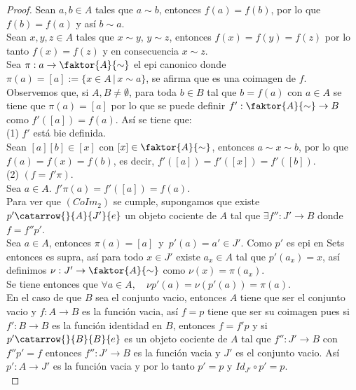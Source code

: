 \documentclass{article}
\begin{document}
\begin{enumerate}[label=\textbf{Ej \arabic*.}]
\begin{proof}
\quad Sean $a,b\in A$ tales que $a\sim b$, entonces $f(a)=f(b)$, por lo que $f(b)=f(a)$ y así $b\sim a$.\\

\quad Sean $x,y,z\in A$ tales que $x\sim y$, $y\sim z$, entonces $f(x)=f(y)=f(z)$ por lo tanto $f(x)=f(z)$ y en consecuencia
$x\sim z$.\\

Sea $\pi:a\to \faktor{A}{\sim}$ el epi canonico donde $\pi(a)=[a]:=\{x\in A\,|\,x\sim a\}$, se afirma que es una coimagen de $f$.\\

Observemos que, si $A,B\neq \emptyset$, para toda $b\in B$ tal que $b=f(a)$ con $a\in A$ se tiene que $\pi(a)=[a]$ por lo que se puede definir 
$f': \faktor{A}{\sim}\to B$ como $f'([a])=f(a)$. Así se tiene que:\\

(1) $f'$ está bie definida.\\

Sean $[a][b]\in [x]$ con $[x]\in  \faktor{A}{\sim}$, entonces $a\sim x\sim b$, por lo que \\$f(a)=f(x)=f(b)$, es decir, $f'([a])=f'([x])=f'([b])$.\\

(2) $(f=f'\pi)$.\\

Sea $a\in A$. $f'\pi(a)=f'([a])=f(a)$.\\

Para ver que $(CoIm_2)$ se cumple, supongamos que existe $p'\catarrow{}{A}{J'}{e}$  un objeto cociente de $A$ tal que $\exists f'':J'\to B$ donde 
$f=f''p'$.\\
Sea $a\in A$, entonces $\pi(a)=[a]$\,\,\,y\,\,\,$p'(a)=a'\in J'$. Como $p'$ es epi en Sets entonces es supra, así para todo $x\in J'$ existe $a_x\in A$
tal que $p'(a_x)=x$, así definimos $\nu:J' \to \faktor{A}{\sim}$ como $\nu(x)=\pi(a_x)$.\\

Se tiene entonces que $\forall a\in A,\quad \nu p'(a)=\nu(p'(a))=\pi(a).$\\

En el caso de que $B$ sea el conjunto vacio, entonces $A$ tiene que ser el conjunto vacio y $f:A\to B$ es la función vacia, así $f=p$ tiene que ser su
coimagen pues si $f':B\to B$ es la función identidad en $B$, entonces $f=f'p$ y si $p'\catarrow{}{B}{B}{e}$ es un objeto cociente de $A$ tal que $f'':J'\to B$
con $f''p'=f$ entonces $f'':J'\to B$ es la función vacia y $J'$ es el conjunto vacio. Así $p':A\to J'$ es la función vacia y por lo tanto $p'=p$ y 
$Id_{J'}\circ p'=p$.\\


\end{proof}
\end{enumerate}
\end{document}

